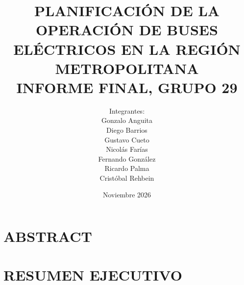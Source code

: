 \documentclass[pdftex,spanish]{pucthesis}	%
\begin{document}

\title[PLANIFICACIÓN DE LA OPERACIÓN DE BUSES ELÉCTRICOS EN LA REGIÓN METROPOLITANA\\ INFORME FINAL, GRUPO 29]
   {\bf PLANIFICACIÓN DE LA OPERACIÓN DE BUSES ELÉCTRICOS EN LA REGIÓN METROPOLITANA\\ INFORME FINAL, GRUPO 29}
\author[Integrantes:]{Integrantes:\\
\textnormal{\small{
Gonzalo Anguita\\
Diego Barrios\\
Gustavo Cueto\\
Nicolás Farías\\
Fernando González\\
Ricardo Palma\\
Cristóbal Rehbein}
}
}

\address{Escuela de Ingenier\'ia\\
                   Pontificia Universidad Cat\'olica de Chile\\
                   Vicu\~na Mackenna 4860\\
                  Santiago, Chile\\
                  {\it Tel.\/} : 56 (2) 354-2000}

\date                       {Noviembre 2026}

\NoChapterPageNumber
{}
\maketitle

\tableofcontents
{} \label{listoffigures}
\listoffigures
{} \label{listoftables}
\listoftables
\cleardoublepage

 \label{abstract}
\chapter*{ABSTRACT}

\cleardoublepage

 \label{resumen}
\chapter*{RESUMEN EJECUTIVO}

\cleardoublepage
\end{document}
